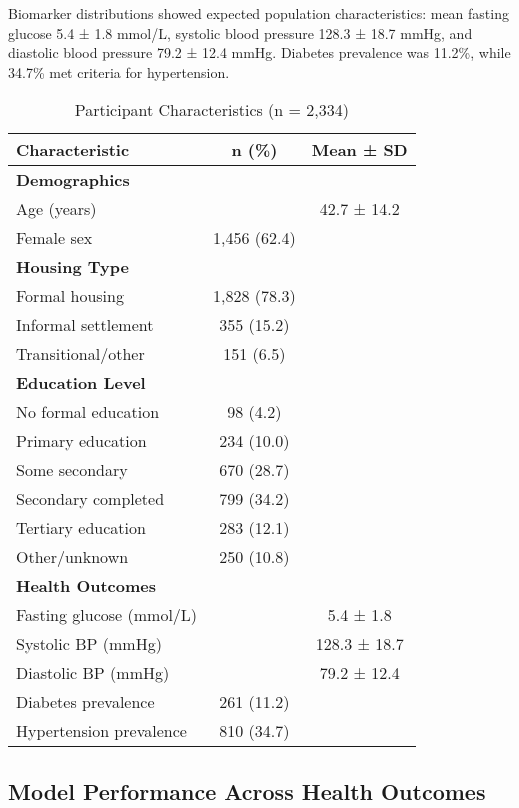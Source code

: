 \documentclass[journal,article,submit,pdftex,moreauthors]{Definitions/mdpi}
\begin{document}
Biomarker distributions showed expected population characteristics: mean fasting glucose 5.4 ± 1.8 mmol/L, systolic blood pressure 128.3 ± 18.7 mmHg, and diastolic blood pressure 79.2 ± 12.4 mmHg. Diabetes prevalence was 11.2\%, while 34.7\% met criteria for hypertension.

\begin{table}[H]
\caption{Participant Characteristics (n = 2,334)}
\label{tab:characteristics}
\centering
\begin{tabular}{lcc}
\toprule
\textbf{Characteristic} & \textbf{n (\%)} & \textbf{Mean ± SD} \\
\midrule
\multicolumn{3}{l}{\textbf{Demographics}} \\
Age (years) & & 42.7 ± 14.2 \\
Female sex & 1,456 (62.4) & \\
\multicolumn{3}{l}{\textbf{Housing Type}} \\
Formal housing & 1,828 (78.3) & \\
Informal settlement & 355 (15.2) & \\
Transitional/other & 151 (6.5) & \\
\multicolumn{3}{l}{\textbf{Education Level}} \\
No formal education & 98 (4.2) & \\
Primary education & 234 (10.0) & \\
Some secondary & 670 (28.7) & \\
Secondary completed & 799 (34.2) & \\
Tertiary education & 283 (12.1) & \\
Other/unknown & 250 (10.8) & \\
\multicolumn{3}{l}{\textbf{Health Outcomes}} \\
Fasting glucose (mmol/L) & & 5.4 ± 1.8 \\
Systolic BP (mmHg) & & 128.3 ± 18.7 \\
Diastolic BP (mmHg) & & 79.2 ± 12.4 \\
Diabetes prevalence & 261 (11.2) & \\
Hypertension prevalence & 810 (34.7) & \\
\bottomrule
\end{tabular}
\end{table}

\subsection{Model Performance Across Health Outcomes}
\end{document}
